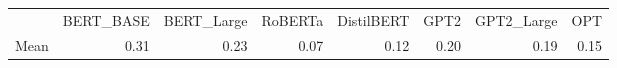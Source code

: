 \begin{tabular}{lrrrrrrr}
 & BERT_BASE & BERT_Large & RoBERTa & DistilBERT & GPT2 & GPT2_Large & OPT \\
Mean & 0.31 & 0.23 & 0.07 & 0.12 & 0.20 & 0.19 & 0.15 \\
\end{tabular}
